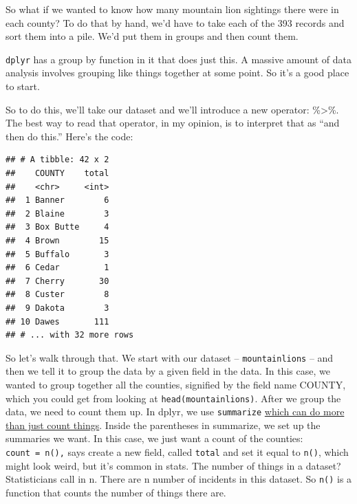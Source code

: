 \documentclass[]{book}
\newenvironment{Shaded}{\begin{snugshade}}{\end{snugshade}}
\newcommand{\KeywordTok}[1]{\textcolor[rgb]{0.13,0.29,0.53}{\textbf{#1}}}
\newcommand{\DataTypeTok}[1]{\textcolor[rgb]{0.13,0.29,0.53}{#1}}
\newcommand{\StringTok}[1]{\textcolor[rgb]{0.31,0.60,0.02}{#1}}
\newcommand{\OperatorTok}[1]{\textcolor[rgb]{0.81,0.36,0.00}{\textbf{#1}}}
\newcommand{\NormalTok}[1]{#1}
\begin{document}
So what if we wanted to know how many mountain lion sightings there were
in each county? To do that by hand, we'd have to take each of the 393
records and sort them into a pile. We'd put them in groups and then
count them.

\texttt{dplyr} has a group by function in it that does just this. A
massive amount of data analysis involves grouping like things together
at some point. So it's a good place to start.

So to do this, we'll take our dataset and we'll introduce a new
operator: \%\textgreater{}\%. The best way to read that operator, in my
opinion, is to interpret that as ``and then do this.'' Here's the code:

\begin{Shaded}
\end{Shaded}

\begin{verbatim}
## # A tibble: 42 x 2
##    COUNTY    total
##    <chr>     <int>
##  1 Banner        6
##  2 Blaine        3
##  3 Box Butte     4
##  4 Brown        15
##  5 Buffalo       3
##  6 Cedar         1
##  7 Cherry       30
##  8 Custer        8
##  9 Dakota        3
## 10 Dawes       111
## # ... with 32 more rows
\end{verbatim}

So let's walk through that. We start with our dataset --
\texttt{mountainlions} -- and then we tell it to group the data by a
given field in the data. In this case, we wanted to group together all
the counties, signified by the field name COUNTY, which you could get
from looking at \texttt{head(mountainlions)}. After we group the data,
we need to count them up. In dplyr, we use \texttt{summarize}
\href{http://dplyr.tidyverse.org/reference/summarise.html}{which can do
more than just count things}. Inside the parentheses in summarize, we
set up the summaries we want. In this case, we just want a count of the
counties: \texttt{count\ =\ n(),} says create a new field, called
\texttt{total} and set it equal to \texttt{n()}, which might look weird,
but it's common in stats. The number of things in a dataset?
Statisticians call in n. There are n number of incidents in this
dataset. So \texttt{n()} is a function that counts the number of things
there are.
\end{document}
